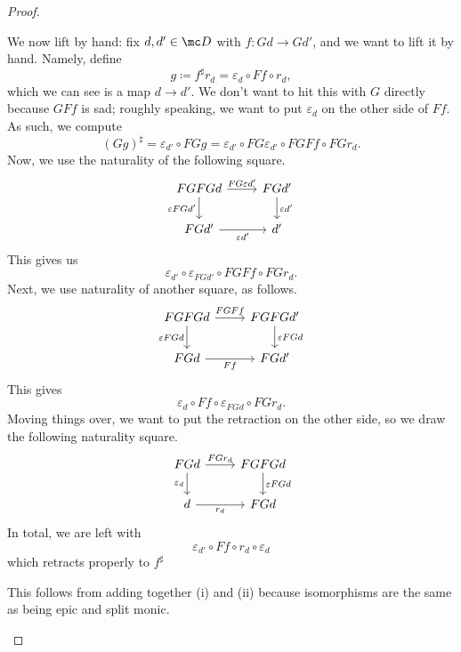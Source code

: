 \begin{proof}
\begin{listroman}
		We now lift by hand: fix $d,d'\in\mc D$ with $f\colon Gd\to Gd'$, and we want to lift it by hand. Namely, define
		\[g\coloneqq f^\sharp r_d=\varepsilon_d\circ Ff\circ r_d,\]
		which we can see is a map $d\to d'$. We don't want to hit this with $G$ directly because $GFf$ is sad; roughly speaking, we want to put $\varepsilon_d$ on the other side of $Ff$. As such, we compute
		\[(Gg)^\sharp=\varepsilon_{d'}\circ FGg=\varepsilon_{d'}\circ FG\varepsilon_{d'}\circ FGFf\circ FGr_d.\]
		Now, we use the naturality of the following square.
		\[\begin{tikzcd}
			FGFGd & {FGd'} \\
			{FGd'} & {d'}
			\arrow["{\varepsilon FGd'}"', from=1-1, to=2-1]
			\arrow["{FG\varepsilon d'}", from=1-1, to=1-2]
			\arrow["{\varepsilon d'}", from=1-2, to=2-2]
			\arrow["{\varepsilon d'}"', from=2-1, to=2-2]
		\end{tikzcd}\]
		This gives us
		\[\varepsilon_{d'}\circ\varepsilon_{FGd'}\circ FGFf\circ FGr_d.\]
		Next, we use naturality of another square, as follows.
		\[\begin{tikzcd}
			FGFGd & {FGFGd'} \\
			FGd & {FGd'}
			\arrow["{\varepsilon FGd}"', from=1-1, to=2-1]
			\arrow["FGFf", from=1-1, to=1-2]
			\arrow["Ff"', from=2-1, to=2-2]
			\arrow["{\varepsilon FGd}", from=1-2, to=2-2]
		\end{tikzcd}\]
		This gives
		\[\varepsilon_d\circ Ff\circ \varepsilon_{FGd}\circ FGr_d.\]
		Moving things over, we want to put the retraction on the other side, so we draw the following naturality square.
		\[\begin{tikzcd}
			FGd & FGFGd \\
			d & FGd
			\arrow["{r_d}"', from=2-1, to=2-2]
			\arrow["{FGr_d}", from=1-1, to=1-2]
			\arrow["{\varepsilon_d}"', from=1-1, to=2-1]
			\arrow["{\varepsilon FGd}", from=1-2, to=2-2]
		\end{tikzcd}\]
		In total, we are left with
		\[\varepsilon_{d'}\circ Ff\circ r_d\circ\varepsilon_d\]
		which retracts properly to $f^\sharp$
		\item This follows from adding together (i) and (ii) because isomorphisms are the same as being epic and split monic.
		\qedhere
	\end{listroman}
\end{proof}
